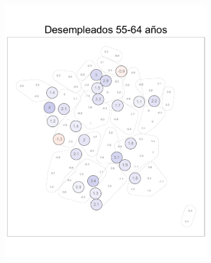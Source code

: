 \begin{figure}
\begin{subfigure}{0.275\textwidth}
	\includegraphics[width = \textwidth]{Figs/Efectos/Dorling_Efectos_Des3_Modelo_H}
	\end{subfigure}
	~
	\begin{subfigure}{0.275\textwidth}

\end{subfigure}
\end{figure}
